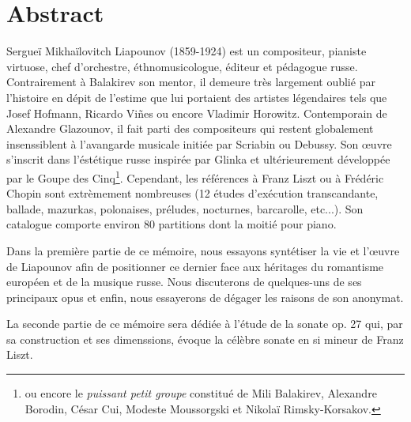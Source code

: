 
\chapter*{Abstract}

Sergueï Mikhaïlovitch Liapounov (1859-1924) est un compositeur, pianiste virtuose,
chef d'orchestre, éthnomusicologue, éditeur et pédagogue russe. Contrairement à
Balakirev son mentor, il demeure très largement oublié par l'histoire en dépit
de l'estime que lui portaient des artistes légendaires tels que Josef Hofmann,
Ricardo Vi\~{n}es ou encore Vladimir Horowitz.
Contemporain de Alexandre Glazounov, il fait parti des compositeurs qui restent
globalement insenssiblent à l'avangarde musicale initiée par Scriabin ou Debussy.
Son œuvre s'inscrit dans l'éstétique russe inspirée par Glinka et ultérieurement
développée par le Goupe des Cinq\footnote{ou encore le \emph{puissant petit groupe}
constitué de Mili Balakirev, Alexandre Borodin, César Cui, Modeste Moussorgski
et Nikolaï Rimsky-Korsakov.}. Cependant, les références à Franz Liszt ou à Frédéric
Chopin sont extrèmement nombreuses (12 études d'exécution transcandante, ballade,
mazurkas, polonaises, préludes, nocturnes, barcarolle, etc...). Son catalogue
comporte environ 80 partitions dont la moitié pour piano.

Dans la première partie de ce mémoire, nous essayons syntétiser la vie et
l'œuvre de Liapounov afin de positionner ce dernier face aux héritages du
romantisme européen et de la musique russe. Nous discuterons de quelques-uns
de ses principaux opus et enfin, nous essayerons de dégager les raisons de son
anonymat.

La seconde partie de ce mémoire sera dédiée à l'étude de la sonate op. 27 qui,
par sa construction et ses dimenssions, évoque la célèbre sonate en si mineur
de Franz Liszt.

